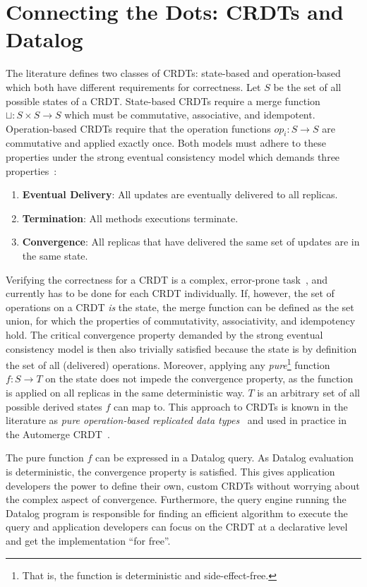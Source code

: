 \documentclass{article}
\begin{document}
\section{Connecting the Dots: CRDTs and Datalog}
\label{sec:crdts_datalog}

The literature defines two classes of CRDTs: state-based and operation-based
which both have different requirements for correctness.
Let \( S \) be the set of all possible states of a CRDT.
State-based CRDTs require a merge function \( \sqcup: S \times S \to S \)
which must be commutative, associative, and idempotent.
Operation-based CRDTs require that the operation functions \( op_i: S \to S \)
are commutative and applied exactly once.
Both models must adhere to these properties under the strong eventual consistency
model which demands three properties~\cite{shapiro2011comprehensive}:

\begin{enumerate}
	\item \textbf{Eventual Delivery}: All updates are eventually delivered to all replicas.
	\item \textbf{Termination}: All methods executions terminate.
	\item \textbf{Convergence}: All replicas that have delivered the same set of updates are in the same state.
\end{enumerate}

Verifying the correctness for a CRDT is a complex,
error-prone task~\cite{gomes2017verifying, kleppmann2022assessing},
and currently has to be done for each CRDT individually.
If, however, the set of operations on a CRDT \emph{is} the state,
the merge function can be defined as the set union,
for which the properties of commutativity, associativity, and idempotency hold.
The critical convergence property demanded by the strong eventual consistency
model is then also trivially satisfied because the state is by definition
the set of all (delivered) operations.
Moreover, applying any \emph{pure}\footnote{
	That is, the function is deterministic and side-effect-free.
}
function \( f: S \to T \) on the state does not impede the convergence property,
as the function is applied on all replicas in the same deterministic way.
\( T \) is an arbitrary set of all possible derived states \( f \) can map to.
This approach to CRDTs is known in the literature as
\emph{pure operation-based replicated data types}~\cite{baquero2017pure, stewen2024undo}
and used in practice in the Automerge CRDT~\cite{automerge}.

The pure function \( f \) can be expressed in a Datalog query.
As Datalog evaluation is deterministic, the convergence property is satisfied.
This gives application developers the power to define their own, custom CRDTs
without worrying about the complex aspect of convergence.
Furthermore, the query engine running the Datalog program is responsible
for finding an efficient algorithm to execute the query and application developers
can focus on the CRDT at a declarative level and get the implementation ``for free''.
\end{document}
